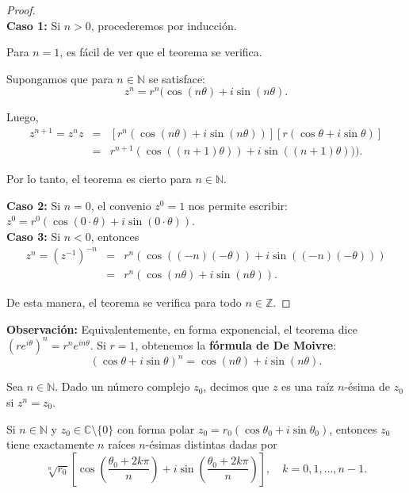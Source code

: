 \begin{proof}
\
\\

\textbf{Caso 1:} Si $n > 0$, procederemos por inducción.

Para $n = 1$, es fácil de ver que el teorema se verifica.

Supongamos que para $n \in \mathbb{N}$ se satisface:
$$z^n = r^n (\cos(n\theta) + i \sin(n\theta).$$

Luego,
\begin{eqnarray*}
z^{n+1} = z^n z &=& [r^n (\cos (n\theta) + i\sin(n\theta))][r (\cos \theta + i \sin \theta)] \\
&=& r^{n+1} (\cos((n+1) \theta)) + i \sin((n+1) \theta))).
\end{eqnarray*}

Por lo tanto, el teorema es cierto para $n \in \mathbb{N}$.

\textbf{Caso 2:} Si $n = 0$, el convenio $z^0=1$ nos permite escribir: $z^0 = r^0 (\cos(0\cdot \theta) + i \sin(0 \cdot \theta)).$
\\

\textbf{Caso 3:} Si $n <0$, entonces
\begin{eqnarray*}
z^n = (z^{-1})^{-n} &=& r^n (\cos((-n)(-\theta)) + i \sin((-n)(-\theta))) \\
&=& r^n (\cos (n\theta) + i\sin(n\theta)).
\end{eqnarray*}

De esta manera, el teorema se verifica para todo $n \in \mathbb{Z}$.

\end{proof}

\textbf{Observación:} Equivalentemente, en forma exponencial, el teorema dice $(re^{i\theta})^n = r^n e^{in\theta}$. Si $r= 1$, obtenemos la \textbf{fórmula de De Moivre}:
$$(\cos \theta + i \sin\theta)^n = \cos(n \theta) + i \sin(n\theta).$$

\begin{defi}
Sea $n \in \mathbb{N}$. Dado un número complejo $z_0$, decimos que $z$ es una raíz $n$-ésima de $z_0$ si $z^n = z_0$.
\end{defi}

\begin{teorema}
Si $n \in \mathbb{N}$ y $z_0 \in \mathbb{C} \setminus \{0\}$ con forma polar $z_0 = r_0 (\cos \theta_0 + i \sin\theta_0) $, entonces $z_0$ tiene exactamente $n$ raíces $n$-ésimas distintas dadas por
$$\sqrt[n]{r_0} \left[ \cos \left( \frac{\theta_0 + 2k\pi}{n} \right) + i \sin \left( \frac{\theta_0 + 2k\pi}{n} \right)\right], \quad k = 0,1, \dots, n-1.$$
\end{teorema}

